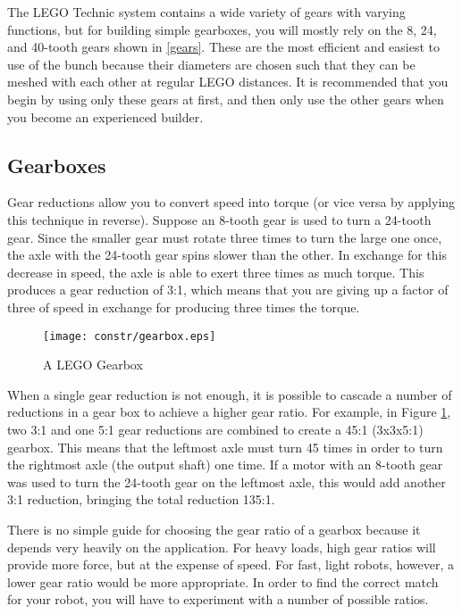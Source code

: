 The LEGO Technic system contains a wide variety of gears with varying
functions, but for building simple gearboxes, you will mostly rely on
the 8, 24, and 40-tooth gears shown in \ref{gears}. These are the most
efficient and easiest to use of the bunch because their diameters are
chosen such that they can be meshed with each other at regular LEGO
distances. It is recommended that you begin by using only these gears
at first, and then only use the other gears when you become an
experienced builder.

\subsection{Gearboxes}

Gear reductions allow you to convert speed into torque (or vice versa
by applying this technique in reverse). Suppose an 8-tooth gear is
used to turn a 24-tooth gear. Since the smaller gear must rotate three
times to turn the large one once, the axle with the 24-tooth gear
spins slower than the other. In exchange for this decrease in speed,
the axle is able to exert three times as much torque. This produces a
gear reduction of 3:1, which means that you are giving up a factor of
three of speed in exchange for producing three times the torque.

\begin{figure}[htbp]
\begin{center}
\texttt{[image: constr/gearbox.eps]}
\caption{A LEGO Gearbox}
\label{gearbox}
\end{center}
\end{figure}

When a single gear reduction is not enough, it is possible to cascade
a number of reductions in a gear box to achieve a higher gear
ratio. For example, in Figure \ref{gearbox}, two 3:1 and one 5:1 gear
reductions are combined to create a 45:1 (3x3x5:1) gearbox. This means
that the leftmost axle must turn 45 times in order to turn the
rightmost axle (the output shaft) one time. If a motor with an 8-tooth
gear was used to turn the 24-tooth gear on the leftmost axle, this
would add another 3:1 reduction, bringing the total reduction 135:1.

There is no simple guide for choosing the gear ratio of a gearbox
because it depends very heavily on the application. For heavy loads,
high gear ratios will provide more force, but at the expense of
speed. For fast, light robots, however, a lower gear ratio would be
more appropriate. In order to find the correct match for your robot,
you will have to experiment with a number of possible ratios.

